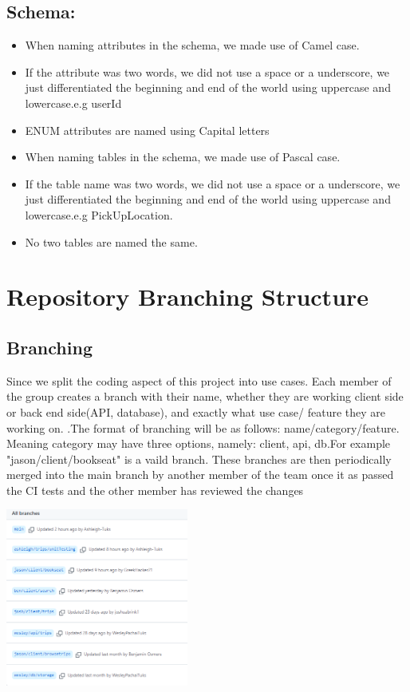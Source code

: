 \documentclass[hidelinks, 12pt, a4paper]{article}
\begin{document}
         \vspace{0.5cm} 
        
         \subsection{\large{\textbf{Schema:}}}
        \begin{itemize}[]
            \item  When naming attributes in the schema, we made use of Camel case.
            \item If the attribute was two words, we did not use a space or a underscore, we just differentiated the beginning and end of the world using uppercase and lowercase.e.g userId
            \item ENUM attributes are named using Capital letters
            \item  When naming tables in the schema, we made use of Pascal case.
            \item If the table name was two words, we did not use a space or a underscore, we just differentiated the beginning and end of the world using uppercase and lowercase.e.g PickUpLocation.
            \item No two tables are named the same.
        \end{itemize}
        
\newpage
        
\section{Repository Branching Structure}
\subsection{Branching}
Since we split the coding aspect of this project into use cases. Each member of the group creates a branch with their name, whether they are working client side or back end side(API, database), and exactly what use case/ feature they are working on. .The format of branching will be as follows: name/category/feature. Meaning category may have three options, namely: client, api, db.For example "jason/client/bookseat" is a vaild branch. These branches are then periodically merged into the main branch by another member of the team once it as passed the CI tests and the other member has reviewed the changes
\vspace{0.2cm} 
\begin{center}
    \includegraphics[width=6cm]{images/Branching.png} \\
\end{center}
\vspace{0.5cm} 
\end{document}
